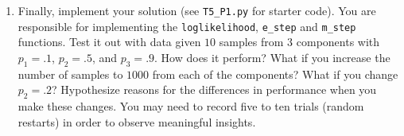 \documentclass[submit]{harvardml}
\begin{document}
\begin{problem}
\begin{enumerate}
\item Finally, implement your solution (see \texttt{T5\_P1.py} for starter code).  You are responsible for implementing the \texttt{loglikelihood}, \texttt{e\_step} and \texttt{m\_step} functions. Test it out with data given
  $10$ samples from $3$ components with $p_1 = .1$, $p_2=.5$, and
  $p_3=.9$.  How does it perform?  What if you increase the number of
  samples to $1000$ from each of the components?  What if you change
  $p_2=.2$?  Hypothesize reasons for the differences in performance
  when you make these changes. You may need to record five to ten trials (random restarts) in order to observe meaningful insights.

\end{enumerate}

\end{problem}
\end{document}
